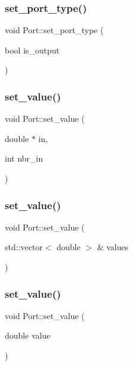 \subsubsection{\texorpdfstring{set\+\_\+port\+\_\+type()}{set\_port\_type()}}
{\footnotesize\ttfamily void Port\+::set\+\_\+port\+\_\+type (\begin{DoxyParamCaption}\item[{bool}]{is\+\_\+output }\end{DoxyParamCaption})}

\mbox{\label{class_port_a18b368a7d48acb802b6671693f54adcb}} 
\subsubsection{\texorpdfstring{set\+\_\+value()}{set\_value()}\hspace{0.1cm}{\footnotesize\ttfamily [1/3]}}
{\footnotesize\ttfamily void Port\+::set\+\_\+value (\begin{DoxyParamCaption}\item[{double $\ast$}]{in,  }\item[{int}]{nbr\+\_\+in }\end{DoxyParamCaption})}

\mbox{\label{class_port_a664dff6ffb75509465fca1bd89f67ab2}} 
\subsubsection{\texorpdfstring{set\+\_\+value()}{set\_value()}\hspace{0.1cm}{\footnotesize\ttfamily [2/3]}}
{\footnotesize\ttfamily void Port\+::set\+\_\+value (\begin{DoxyParamCaption}\item[{std\+::vector$<$ double $>$ \&}]{values }\end{DoxyParamCaption})}

\mbox{\label{class_port_a28311c7a8fe9e2838aa8ae63a37d2d9a}} 
\subsubsection{\texorpdfstring{set\+\_\+value()}{set\_value()}\hspace{0.1cm}{\footnotesize\ttfamily [3/3]}}
{\footnotesize\ttfamily void Port\+::set\+\_\+value (\begin{DoxyParamCaption}\item[{double}]{value }\end{DoxyParamCaption})}

